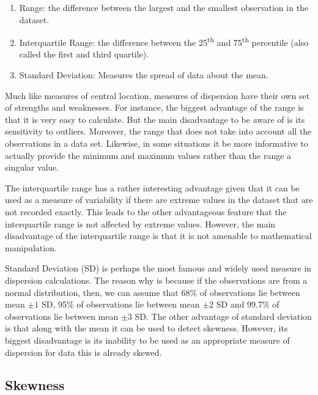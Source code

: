 \begin{enumerate}
    \item Range: the difference between the largest and the smallest observation 
    in the dataset.
    \item Interquartile Range: the difference between the 25\textsuperscript{th} and 
    75\textsuperscript{th} percentile (also called the first and third quartile).
    \item Standard Deviation: Measures the spread of data about the mean. 
\end{enumerate}

Much like measures of central location, measures of dispersion have their own set of
strengths and weaknesses. For instance, the biggest advantage of the range is that 
it is very easy to calculate. But the main disadvantage to be aware of is its 
sensitivity to outliers. Moreover, the range that does not take into account all 
the observations in a data set. Likewise, in some situations it be more informative 
to actually provide the minimum and maximum values rather than the range a singular value.

The interquartile range has a rather interesting advantage given that it can be used as 
a measure of variability if there are extreme values in the dataset that are not 
recorded exactly. This leads to the other advantageous feature that the interquartile 
range is not affected by extreme values. However, the main disadvantage of the 
interquartile range is that it is not amenable to mathematical manipulation.

Standard Deviation (SD) is perhaps the most famous and widely used measure in dispersion
calculations. The reason why is because if the observations are from a normal distribution, 
then, we can assume that 68\% of observations lie between mean $\pm1$ SD, 95\% of 
observations lie between mean $\pm{2}$ SD and 99.7\% of observations lie between 
mean $\pm{3}$ SD. The other advantage of standard deviation is that along with the 
mean it can be used to detect skewness. However, its biggest disadvantage is its 
inability to be used as an appropriate measure of dispersion for data this is 
already skewed.

\subsection{Skewness}

